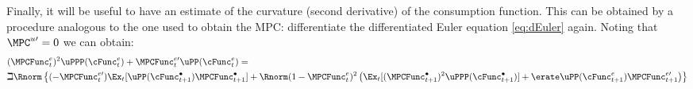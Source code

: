 \documentclass{handout}
\begin{document}
Finally, it will be useful to have an estimate of the curvature (second derivative) of the consumption function.  This can be obtained by a procedure analogous to the one used to obtain the MPC: differentiate the differentiated Euler equation \eqref{eq:dEuler} again.  Noting that $\MPC^{u\prime}=0$ we can obtain:
\begin{equation}\begin{gathered}\begin{aligned}
\lefteqn{  (\MPCFunc^{e}_{t})^{2} \uPPP(\cFunc^{e}_{t}) +\MPCFunc_{t}^{e\prime}\uPP(\cFunc^{e}_{t}) = } &   \nonumber \\ 
&  \beth \Rnorm \left\{(-\MPCFunc_{t}^{e\prime}) \Ex_{t}[\uPP(\cFunc^{\bullet}_{t+1})\MPCFunc^{\bullet}_{t+1}]
+  \Rnorm (1-\MPCFunc^{e}_{t})^{2}\left(\Ex_{t}[(\MPCFunc_{t+1}^{\bullet})^{2}\uPPP(\cFunc^{\bullet}_{t+1})]+\erate  \uPP(\cFunc^{e}_{t+1})\MPCFunc_{t+1}^{e\prime}\right)\right\} \nonumber \\ \label{eq:kappaPExpr}
\end{aligned}\end{gathered}\end{equation}
\end{document}
